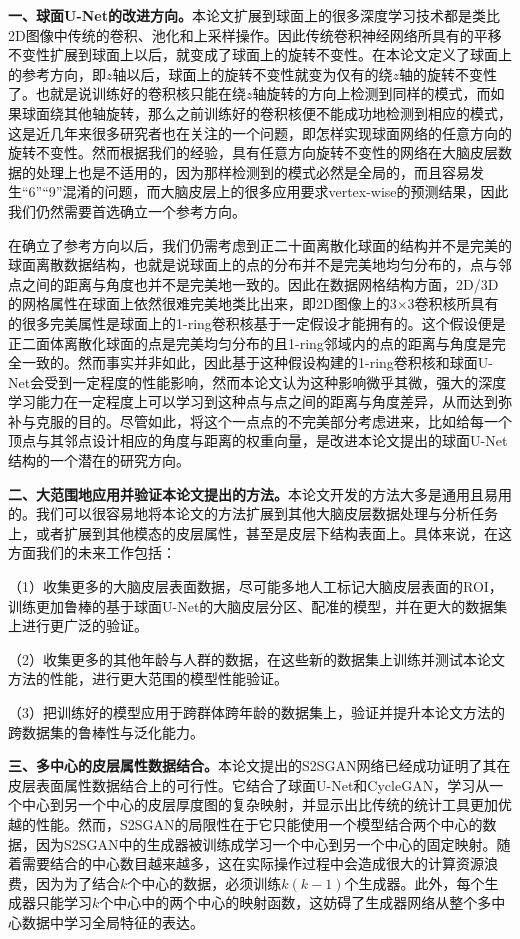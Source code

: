 \textbf{一、球面U-Net的改进方向。}本论文扩展到球面上的很多深度学习技术都是类比2D图像中传统的卷积、池化和上采样操作。因此传统卷积神经网络所具有的平移不变性扩展到球面上以后，就变成了球面上的旋转不变性。在本论文定义了球面上的参考方向，即$z$轴以后，球面上的旋转不变性就变为仅有的绕$z$轴的旋转不变性了。也就是说训练好的卷积核只能在绕$z$轴旋转的方向上检测到同样的模式，而如果球面绕其他轴旋转，那么之前训练好的卷积核便不能成功地检测到相应的模式，这是近几年来很多研究者也在关注的一个问题\cite{esteves2018learning,cohen2018spherical,cohen2019gauge}，即怎样实现球面网络的任意方向的旋转不变性。然而根据我们的经验，具有任意方向旋转不变性的网络在大脑皮层数据的处理上也是不适用的，因为那样检测到的模式必然是全局的，而且容易发生“6”“9”混淆的问题，而大脑皮层上的很多应用要求vertex-wise的预测结果，因此我们仍然需要首选确立一个参考方向。

在确立了参考方向以后，我们仍需考虑到正二十面离散化球面的结构并不是完美的球面离散数据结构，也就是说球面上的点的分布并不是完美地均匀分布的，点与邻点之间的距离与角度也并不是完美地一致的。因此在数据网格结构方面，2D/3D的网格属性在球面上依然很难完美地类比出来，即2D图像上的3$\times$3卷积核所具有的很多完美属性是球面上的1-ring卷积核基于一定假设才能拥有的。这个假设便是正二面体离散化球面的点是完美均匀分布的且1-ring邻域内的点的距离与角度是完全一致的。然而事实并非如此，因此基于这种假设构建的1-ring卷积核和球面U-Net会受到一定程度的性能影响，然而本论文认为这种影响微乎其微，强大的深度学习能力在一定程度上可以学习到这种点与点之间的距离与角度差异，从而达到弥补与克服的目的。尽管如此，将这个一点点的不完美部分考虑进来，比如给每一个顶点与其邻点设计相应的角度与距离的权重向量，是改进本论文提出的球面U-Net结构的一个潜在的研究方向。

\textbf{二、大范围地应用并验证本论文提出的方法。}本论文开发的方法大多是通用且易用的。我们可以很容易地将本论文的方法扩展到其他大脑皮层数据处理与分析任务上，或者扩展到其他模态的皮层属性，甚至是皮层下结构表面上。具体来说，在这方面我们的未来工作包括：

（1）收集更多的大脑皮层表面数据，尽可能多地人工标记大脑皮层表面的ROI，训练更加鲁棒的基于球面U-Net的大脑皮层分区、配准的模型，并在更大的数据集上进行更广泛的验证。

（2）收集更多的其他年龄与人群的数据，在这些新的数据集上训练并测试本论文方法的性能，进行更大范围的模型性能验证。

（3）把训练好的模型应用于跨群体跨年龄的数据集上，验证并提升本论文方法的跨数据集的鲁棒性与泛化能力。

\textbf{三、多中心的皮层属性数据结合。}本论文提出的S2SGAN网络已经成功证明了其在皮层表面属性数据结合上的可行性。它结合了球面U-Net和CycleGAN，学习从一个中心到另一个中心的皮层厚度图的复杂映射，并显示出比传统的统计工具更加优越的性能。然而，S2SGAN的局限性在于它只能使用一个模型结合两个中心的数据，因为S2SGAN中的生成器被训练成学习一个中心到另一个中心的固定映射。随着需要结合的中心数目越来越多，这在实际操作过程中会造成很大的计算资源浪费，因为为了结合$k$个中心的数据，必须训练$k(k-1)$个生成器。此外，每个生成器只能学习$k$个中心中的两个中心的映射函数，这妨碍了生成器网络从整个多中心数据中学习全局特征的表达。

